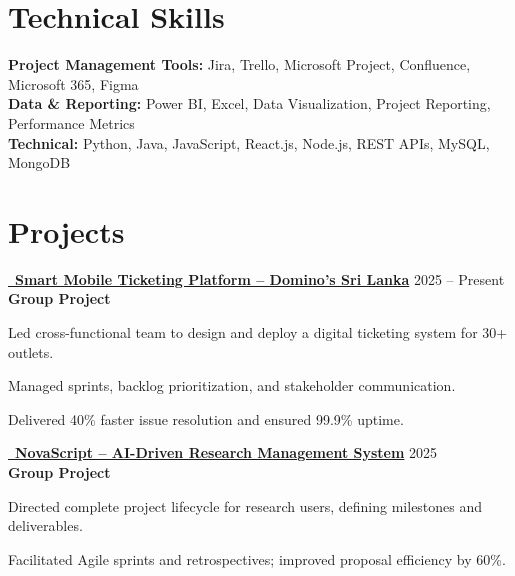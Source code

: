 \documentclass[letterpaper,11pt]{article}
\newenvironment{resume_list}{
  \vspace{-1pt}
  \begin{itemize}[itemsep=2pt, leftmargin=14pt]
}{
  \end{itemize}\vspace{-2pt}
}
\begin{document}
\section{Technical Skills}
\vspace{-1pt}

\textbf{Project Management Tools:} Jira, Trello, Microsoft Project, Confluence, Microsoft 365, Figma\\[3pt]
\textbf{Data \& Reporting:} Power BI, Excel, Data Visualization, Project Reporting, Performance Metrics\\[3pt]
\textbf{Technical:} Python, Java, JavaScript, React.js, Node.js, REST APIs, MySQL, MongoDB

\section{Projects}
\vspace{-2pt}

\newcommand{\project}[5]{%
  \noindent
  \href{#1}{\faGithub~\textbf{#2}} \hfill #3\\[-1pt]
  \textbf{#4}\\[-5pt]
  \begin{resume_list}
    #5
  \end{resume_list}
  \vspace{4pt}
}

\project{https://github.com/fixpoint-tech}
{Smart Mobile Ticketing Platform – Domino's Sri Lanka}
{2025 – Present}
{Group Project}{
  \item Led cross-functional team to design and deploy a digital ticketing system for 30+ outlets.
  \item Managed sprints, backlog prioritization, and stakeholder communication.
  \item Delivered 40\% faster issue resolution and ensured 99.9\% uptime.
}

\vspace{12pt}
\project{https://github.com/Chandima0406/NovaScript.git}
{NovaScript – AI-Driven Research Management System}
{2025}
{Group Project}{
  \item Directed complete project lifecycle for research users, defining milestones and deliverables.
  \item Facilitated Agile sprints and retrospectives; improved proposal efficiency by 60\%.
}
\end{document}
